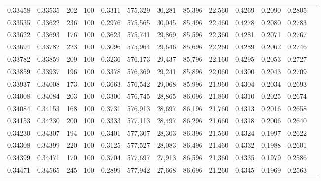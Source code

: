 \begin{tabular}{rrrrrrrrrrrrr}
0.33458 & 0.33535 &   202 & 100 &                                     0.3311 & 575,329 &  30,281 &  85,396 &  22,560 & 0.4269 & 0.2090 & 0.2805 \\
0.33535 & 0.33622 &   236 & 100 &                                     0.2976 & 575,565 &  30,045 &  85,496 &  22,460 & 0.4278 & 0.2080 & 0.2783 \\
0.33622 & 0.33693 &   176 & 100 &                                     0.3623 & 575,741 &  29,869 &  85,596 &  22,360 & 0.4281 & 0.2071 & 0.2767 \\
0.33694 & 0.33782 &   223 & 100 &                                     0.3096 & 575,964 &  29,646 &  85,696 &  22,260 & 0.4289 & 0.2062 & 0.2746 \\
0.33782 & 0.33859 &   209 & 100 &                                     0.3236 & 576,173 &  29,437 &  85,796 &  22,160 & 0.4295 & 0.2053 & 0.2727 \\
0.33859 & 0.33937 &   196 & 100 &                                     0.3378 & 576,369 &  29,241 &  85,896 &  22,060 & 0.4300 & 0.2043 & 0.2709 \\
0.33937 & 0.34008 &   173 & 100 &                                     0.3663 & 576,542 &  29,068 &  85,996 &  21,960 & 0.4304 & 0.2034 & 0.2693 \\
0.34008 & 0.34084 &   203 & 100 &                                     0.3300 & 576,745 &  28,865 &  86,096 &  21,860 & 0.4310 & 0.2025 & 0.2674 \\
0.34084 & 0.34153 &   168 & 100 &                                     0.3731 & 576,913 &  28,697 &  86,196 &  21,760 & 0.4313 & 0.2016 & 0.2658 \\
0.34153 & 0.34230 &   200 & 100 &                                     0.3333 & 577,113 &  28,497 &  86,296 &  21,660 & 0.4318 & 0.2006 & 0.2640 \\
0.34230 & 0.34307 &   194 & 100 &                                     0.3401 & 577,307 &  28,303 &  86,396 &  21,560 & 0.4324 & 0.1997 & 0.2622 \\
0.34308 & 0.34399 &   220 & 100 &                                     0.3125 & 577,527 &  28,083 &  86,496 &  21,460 & 0.4332 & 0.1988 & 0.2601 \\
0.34399 & 0.34471 &   170 & 100 &                                     0.3704 & 577,697 &  27,913 &  86,596 &  21,360 & 0.4335 & 0.1979 & 0.2586 \\
0.34471 & 0.34565 &   245 & 100 &                                     0.2899 & 577,942 &  27,668 &  86,696 &  21,260 & 0.4345 & 0.1969 & 0.2563 \\

\end{tabular}
